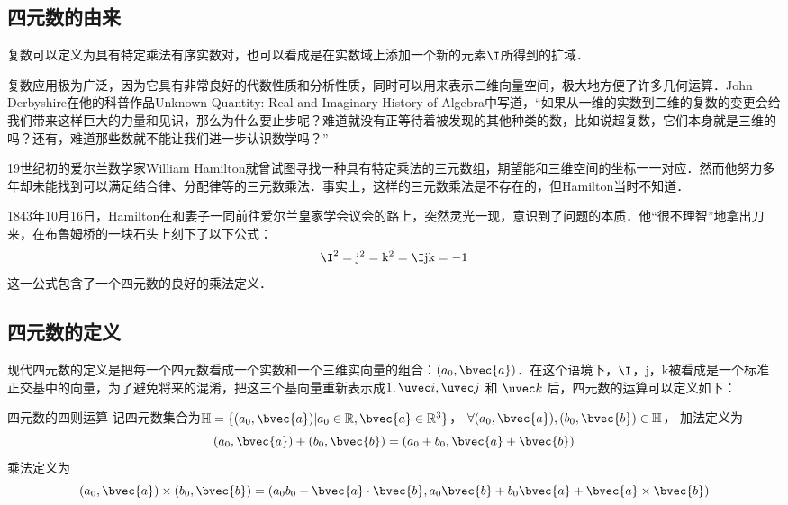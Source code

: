 
\subsection{四元数的由来}

复数可以定义为具有特定乘法有序实数对，也可以看成是在实数域上添加一个新的元素$  \I$所得到的扩域．

复数应用极为广泛，因为它具有非常良好的代数性质和分析性质，同时可以用来表示二维向量空间，极大地方便了许多几何运算．John Derbyshire在他的科普作品Unknown Quantity: Real and Imaginary History of Algebra中写道，“如果从一维的实数到二维的复数的变更会给我们带来这样巨大的力量和见识，那么为什么要止步呢？难道就没有正等待着被发现的其他种类的数，比如说超复数，它们本身就是三维的吗？还有，难道那些数就不能让我们进一步认识数学吗？”

19世纪初的爱尔兰数学家William Hamilton就曾试图寻找一种具有特定乘法的三元数组，期望能和三维空间的坐标一一对应．然而他努力多年却未能找到可以满足结合律、分配律等的三元数乘法．事实上，这样的三元数乘法是不存在的，但Hamilton当时不知道．

1843年10月16日，Hamilton在和妻子一同前往爱尔兰皇家学会议会的路上，突然灵光一现，意识到了问题的本质．他“很不理智”地拿出刀来，在布鲁姆桥的一块石头上刻下了以下公式：
\begin{equation}
\I^2=\mathrm{j}^2=\mathrm{k}^2=\I\mathrm{j}\mathrm{k}=-1
\end{equation}
这一公式包含了一个四元数的良好的乘法定义．

\subsection{四元数的定义}

现代四元数的定义是把每一个四元数看成一个实数和一个三维实向量的组合：$(a_0, \bvec{a})$．在这个语境下，$\I$，$\mathrm{j}$，$\mathrm{k}$被看成是一个标准正交基中的向量，为了避免将来的混淆，把这三个基向量重新表示成$1, \uvec i, \uvec j$ 和 $\uvec k$ 后，四元数的运算可以定义如下：

\begin{definition}{四元数的四则运算}
记四元数集合为$\mathbb{H}=\{(a_0, \bvec{a})|a_0\in\mathbb{R}, \bvec{a}\in\mathbb{R}^3\}$， $\forall(a_0, \bvec{a}), (b_0, \bvec{b})\in\mathbb{H}$， 加法定义为
\begin{equation}
(a_0, \bvec{a})+ (b_0, \bvec{b})=(a_0+b_0, \bvec{a}+\bvec{b})
\end{equation}
乘法定义为
\begin{equation}
(a_0, \bvec{a})\times (b_0, \bvec{b})=(a_0b_0-\bvec{a}\cdot\bvec{b}, a_0\bvec{b}+b_0\bvec{a}+\bvec{a}\times\bvec{b})
\end{equation}
\end{definition}

